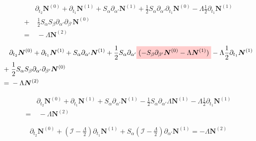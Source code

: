 \documentclass[]{article}
\newcommand{\highlight}[1]{%
  \colorbox{red!20}{$\displaystyle#1$}}
\begin{document}
\begin{appendices}
\begin{equation*}
	\begin{aligned}
		& \partial_{t_2} \boldsymbol{N}^{(0)} + \partial_{t_1} \boldsymbol{N}^{(1)} + S_\alpha \partial_{\alpha'} \boldsymbol{N}^{(1)} +
		\frac{1}{2} S_{\alpha}\partial_{\alpha'} \partial_{t_1} \boldsymbol{N}^{(0)} -  \Lambda \frac{1}{2} \partial_{t_1} \boldsymbol{N}^{(1)} \\
		+ &\; \frac{1}{2} S_\alpha S_\beta\partial_{\alpha'}\partial_{\beta'} \boldsymbol{N}^{(0)} \\
		= &\; - \Lambda  \boldsymbol{N}^{(2)}
	\end{aligned}
\end{equation*}

\begin{equation*}
	\begin{aligned}
		& \partial_{t_2} \boldsymbol{N}^{(0)} + \partial_{t_1} \boldsymbol{N}^{(1)} + S_\alpha \partial_{\alpha'} \boldsymbol{N}^{(1)} +
		\frac{1}{2} S_{\alpha}\partial_{\alpha'} \highlight{(- S_{\beta}\partial_{\beta'} \boldsymbol{N}^{(0)} -  \Lambda \boldsymbol{N}^{(1)})} -  \Lambda \frac{1}{2} \partial_{t_1} \boldsymbol{N}^{(1)} \\
		+ &\; \frac{1}{2} S_\alpha S_\beta\partial_{\alpha'}\partial_{\beta'} \boldsymbol{N}^{(0)} \\
		= &\; - \Lambda  \boldsymbol{N}^{(2)}
	\end{aligned}
\end{equation*}


\begin{equation*}
	\begin{aligned}
		& \partial_{t_2} \boldsymbol{N}^{(0)} + \partial_{t_1} \boldsymbol{N}^{(1)} + S_\alpha \partial_{\alpha'} \boldsymbol{N}^{(1)} -
		\frac{1}{2} S_{\alpha}\partial_{\alpha'} \Lambda \boldsymbol{N}^{(1)} -  \Lambda \frac{1}{2} \partial_{t_1} \boldsymbol{N}^{(1)} \\
		= &\; - \Lambda  \boldsymbol{N}^{(2)}
	\end{aligned}
\end{equation*}

\begin{equation*}
	\begin{aligned}
		\partial_{t_2} \boldsymbol{N}^{(0)} + (\mathcal{I}-\frac{\Lambda}{2} )\partial_{t_1} \boldsymbol{N}^{(1)} + S_\alpha  (\mathcal{I}-\frac{\Lambda}{2} ) \partial_{\alpha'}  \boldsymbol{N}^{(1)}
		= - \Lambda  \boldsymbol{N}^{(2)}
	\end{aligned}
\end{equation*}


\end{appendices}
\end{document}
